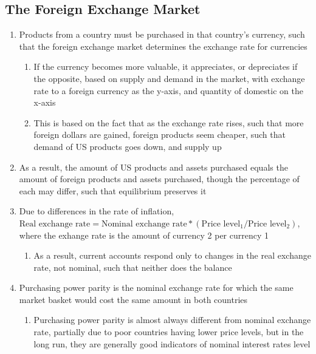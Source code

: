 \documentclass[11 pt, twoside]{article}
\begin{document}
\subsection{The Foreign Exchange Market}
\begin{enumerate}
\item Products from a country must be purchased in that country's currency, such that the foreign exchange market determines the exchange rate for currencies
\begin{enumerate}
\item If the currency becomes more valuable, it appreciates, or depreciates if the opposite, based on supply and demand in the market, with exchange rate to a foreign currency as the y-axis, and quantity of domestic on the x-axis
\item This is based on the fact that as the exchange rate rises, such that more foreign dollars are gained, foreign products seem cheaper, such that demand of US products goes down, and supply up
\end{enumerate}
\item As a result, the amount of US products and assets purchased equals the amount of foreign products and assets purchased, though the percentage of each may differ, such that equilibrium preserves it
\item Due to differences in the rate of inflation, $\text{Real exchange rate} = \text{Nominal exchange rate} * (\text{Price level}_1/\text{Price level}_2)$, where the exhange rate is the amount of currency 2 per currency 1
\begin{enumerate}
\item As a result, current accounts respond only to changes in the real exchange rate, not nominal, such that neither does the balance
\end{enumerate}
\item Purchasing power parity is the nominal exchange rate for which the same market basket would cost the same amount in both countries
\begin{enumerate}
\item Purchasing power parity is almost always different from nominal exchange rate, partially due to poor countries having lower price levels, but in the long run, they are generally good indicators of nominal interest rates level
\end{enumerate}
\end{enumerate}
\end{document}
